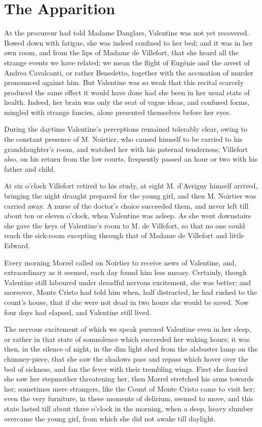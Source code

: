\chapter{The Apparition} 

 \lettrine{A}{s} the procureur had told Madame Danglars, Valentine was not yet recovered. Bowed down with fatigue, she was indeed confined to her bed; and it was in her own room, and from the lips of Madame de Villefort, that she heard all the strange events we have related; we mean the flight of Eugénie and the arrest of Andrea Cavalcanti, or rather Benedetto, together with the accusation of murder pronounced against him. But Valentine was so weak that this recital scarcely produced the same effect it would have done had she been in her usual state of health. Indeed, her brain was only the seat of vague ideas, and confused forms, mingled with strange fancies, alone presented themselves before her eyes. 

 During the daytime Valentine's perceptions remained tolerably clear, owing to the constant presence of M. Noirtier, who caused himself to be carried to his granddaughter's room, and watched her with his paternal tenderness; Villefort also, on his return from the law courts, frequently passed an hour or two with his father and child. 

 At six o'clock Villefort retired to his study, at eight M. d'Avrigny himself arrived, bringing the night draught prepared for the young girl, and then M. Noirtier was carried away. A nurse of the doctor's choice succeeded them, and never left till about ten or eleven o'clock, when Valentine was asleep. As she went downstairs she gave the keys of Valentine's room to M. de Villefort, so that no one could reach the sick-room excepting through that of Madame de Villefort and little Edward. 

 Every morning Morrel called on Noirtier to receive news of Valentine, and, extraordinary as it seemed, each day found him less uneasy. Certainly, though Valentine still laboured under dreadful nervous excitement, she was better; and moreover, Monte Cristo had told him when, half distracted, he had rushed to the count's house, that if she were not dead in two hours she would be saved. Now four days had elapsed, and Valentine still lived. 

 The nervous excitement of which we speak pursued Valentine even in her sleep, or rather in that state of somnolence which succeeded her waking hours; it was then, in the silence of night, in the dim light shed from the alabaster lamp on the chimney-piece, that she saw the shadows pass and repass which hover over the bed of sickness, and fan the fever with their trembling wings. First she fancied she saw her stepmother threatening her, then Morrel stretched his arms towards her; sometimes mere strangers, like the Count of Monte Cristo came to visit her; even the very furniture, in these moments of delirium, seemed to move, and this state lasted till about three o'clock in the morning, when a deep, heavy slumber overcame the young girl, from which she did not awake till daylight. 

